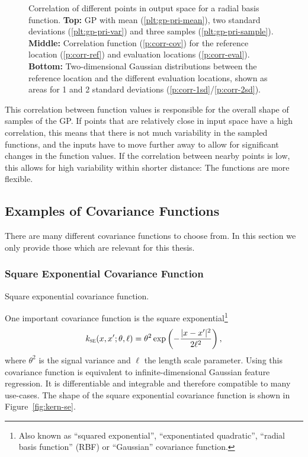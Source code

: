 \begin{figure}
\setlength\figurewidth{\columnwidth}%
\setlength\figureheight{0.618\figurewidth}%
  \caption[Correlation of different points in output space.]{Correlation
of different points in output space for a radial basis function.
{\bfseries Top:} GP with mean
(\ref*{plt:gp-pri-mean}), two standard deviations
(\ref*{plt:gp-pri-var}) and three samples (\ref*{plt:gp-pri-sample}). {\bfseries
Middle:} Correlation function (\ref*{p:corr-cov}) for the
reference location (\ref*{p:corr-ref}) and evaluation locations
(\ref*{p:corr-eval}). {\bfseries Bottom:} Two-dimensional Gaussian
distributions between the reference location and the different evaluation
locations, shown as areas for 1 and 2 standard deviations
(\ref*{p:corr-1sd}/\ref*{p:corr-2sd}).}
  \label{fig:gauss-output-corr}
\end{figure}

This correlation between function values is responsible for the overall shape
of samples of the GP. If points that are relatively close in input space have a
high correlation, this means that there is not much variability in the sampled
functions, and the inputs have to move further away to allow for significant
changes in the function values. If the correlation between nearby points is
low, this allows for high variability within shorter distance: The functions
are more flexible.

\subsection{Examples of Covariance Functions}

There are many different covariance functions to choose from. In this section
we only provide those which are relevant for this thesis.

\subsubsection{Square Exponential Covariance Function}

\begin{marginfigure}
\setlength\figurewidth{\columnwidth}%
\setlength\figureheight{0.618\figurewidth}%
  \caption{Square exponential covariance function.}
  \label{fig:kern-se}
\end{marginfigure}

One important covariance function is the square
exponential\footnote[][3mm]{Also known as ``squared exponential'',
``exponentiated quadratic'', ``radial basis function'' (RBF) or ``Gaussian''
covariance function.}
\begin{equation}
  \label{eq:cov-se}
  \k_\mathsc{se}(x, x'; \theta, \ell) = \theta^2
  \exp\left(-\frac{|x-x'|^2}{2\ell^2}\right),
\end{equation}
where $\theta^2$ is the signal variance and $\ell$ the length scale parameter.
Using this covariance function is equivalent to infinite-dimensional Gaussian
feature regression. It is differentiable and integrable and therefore compatible
to many use-cases. The shape of the square exponential covariance function is
shown in Figure~\ref{fig:kern-se}.

